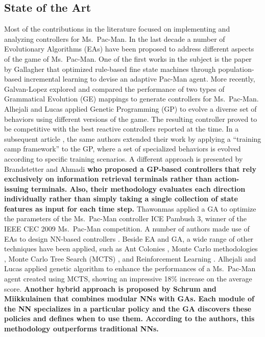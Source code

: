 \documentclass[journal]{IEEEtran}
\begin{document}
\subsection{State of the Art}
Most of the contributions in the literature focused on implementing and analyzing controllers for Ms.\  Pac-Man. In the last decade a number of Evolutionary Algorithms (EAs) have been proposed to address different aspects of the game of Ms.\  Pac-Man. One of the first works in the subject is the paper by Gallagher \cite{Gallagher03} that optimized rule-based fine state machines through population-based incremental learning to devise an adaptive Pac-Man agent. More recently, Galvan-Lopez \cite{Galvan-Lopez10} explored and compared the performance of two types of Grammatical Evolution (GE) mappings to generate controllers for Ms.\  Pac-Man. Alhejali and Lucas \cite{Alhejali10} applied Genetic Programming (GP) to evolve a diverse set of behaviors using different versions of the game. The resulting controller proved to be competitive with the best reactive controllers reported at the time. In a subsequent article \cite{AlhejaliLucas11}, the same authors extended their work by applying a ``training camp framework'' to the GP, where a set of specialized behaviors is evolved according to specific training scenarios. A different approach is presented by Brandstetter and Ahmadi \cite{Brandstetter12} \textbf{who proposed a GP-based controllers that rely exclusively on information retrieval terminals rather than action-issuing terminals. Also, their methodology evaluates each direction individually rather than simply taking a single collection of state features as input for each time step.} Thawonmas \cite{Thawonmas10} applied a GA to optimize the parameters of the Ms.\  Pac-Man controller ICE Pambush 3, winner of the IEEE CEC 2009 Ms.\  Pac-Man competition. A number of authors made use of EAs to design NN-based controllers \cite{Lucas05,Burrow09,Keunhyun10}. Beside EA and GA, a wide range of other techniques have been applied, such as  Ant Colonies \cite{Emilio2010}, Monte Carlo methodologies \cite{Tong2010,Tong2011}, Monte Carlo Tree Search (MCTS) \cite{Samothrakis2011, Ikehata2011}, and Reinforcement Learning \cite{Bom2013}. Alhejali and Lucas \cite{Alhejali2013} applied genetic algorithm to enhance the performances of a Ms.\  Pac-Man agent created using MCTS, showing an impressive 18\% increase on the average score. \textbf{Another hybrid approach is proposed by Schrum and Miikkulainen \cite{Schrum2014} that combines modular NNs with GAs. Each module of the NN specializes in a particular policy and the GA discovers these policies and defines when to use them. According to the authors, this methodology outperforms traditional NNs.}
\end{document}
